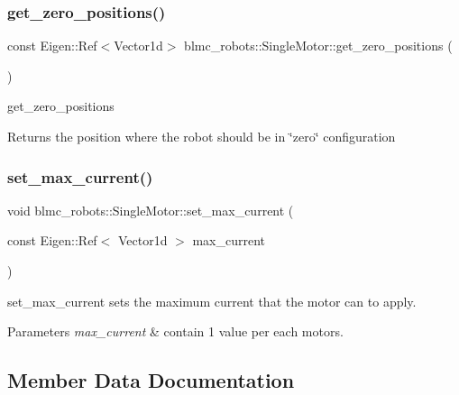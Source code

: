 \subsubsection{\texorpdfstring{get\+\_\+zero\+\_\+positions()}{get\_zero\_positions()}}
{\footnotesize\ttfamily const Eigen\+::\+Ref$<$Vector1d$>$ blmc\+\_\+robots\+::\+Single\+Motor\+::get\+\_\+zero\+\_\+positions (\begin{DoxyParamCaption}{ }\end{DoxyParamCaption})\hspace{0.3cm}{\ttfamily [inline]}}



get\+\_\+zero\+\_\+positions 

\begin{DoxyReturn}{Returns}
the position where the robot should be in \char`\"{}zero\char`\"{} configuration 
\end{DoxyReturn}
\mbox{\label{classblmc__robots_1_1SingleMotor_af2add59e3d08949c658568b6d161b5ba}} 
\subsubsection{\texorpdfstring{set\+\_\+max\+\_\+current()}{set\_max\_current()}}
{\footnotesize\ttfamily void blmc\+\_\+robots\+::\+Single\+Motor\+::set\+\_\+max\+\_\+current (\begin{DoxyParamCaption}\item[{const Eigen\+::\+Ref$<$ Vector1d $>$}]{max\+\_\+current }\end{DoxyParamCaption})\hspace{0.3cm}{\ttfamily [inline]}}



set\+\_\+max\+\_\+current sets the maximum current that the motor can to apply. 


\begin{DoxyParams}{Parameters}
{\em max\+\_\+current} & contain 1 value per each motors. \\
\hline
\end{DoxyParams}


\subsection{Member Data Documentation}
\mbox{\label{classblmc__robots_1_1SingleMotor_a6a57409cef4dc0959ed6b442e7626ba2}} 
